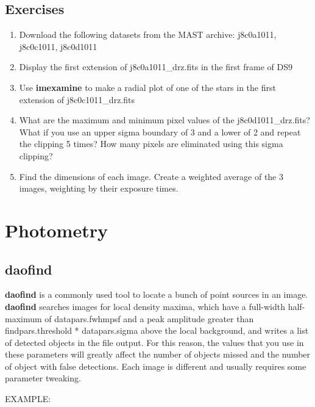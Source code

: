 \subsection{Exercises}
\begin{enumerate}
\item Download the following datasets from the MAST archive: j8c0a1011, j8c0c1011, j8c0d1011
\item Display the first extension of j8c0a1011\_drz.fits in the first frame of DS9
\item Use {\bf imexamine} to make a radial plot of one of the stars in the first extension of j8c0c1011\_drz.fits
\item What are the maximum and minimum pixel values of the j8c0d1011\_drz.fits? What if you use an upper sigma boundary of 3 and a lower of 2 and repeat the clipping 5 times? How many pixels are eliminated using this sigma clipping?
\item Find the dimensions of each image. Create a weighted average of the 3 images, weighting by their exposure times.
\end{enumerate}

\section{Photometry}

\subsection{{\bf daofind}}
{\bf daofind} is a commonly used tool to locate a bunch of point sources in an image. {\bf daofind} searches images  for  local  density  maxima, which  have a full-width half-maximum of datapars.fwhmpsf and a peak amplitude greater than  findpars.threshold  *  datapars.sigma  above the  local  background, and writes a list of detected objects in the file output. For this reason, the values that you use in these parameters will greatly affect the number of objects missed and the number of object with false detections. Each image is different and usually requires some parameter tweaking.

EXAMPLE:

